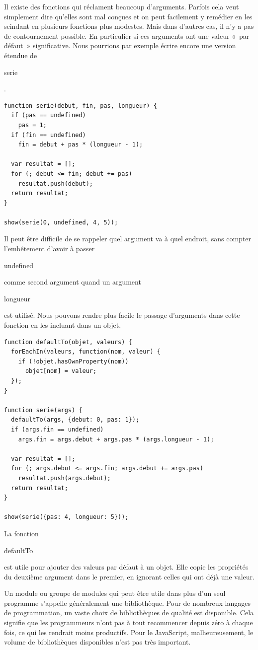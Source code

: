 \documentclass{FramateX}
\renewcommand{\texttt}[1]{\begin{sffamily}{#1}\end{sffamily}}
\begin{document}
\begin{center}\end{center}

Il existe des fonctions qui réclament beaucoup d'arguments. Parfois cela
veut simplement dire qu'elles sont mal conçues et on peut facilement y
remédier en les scindant en plusieurs fonctions plus modestes. Mais dans
d'autres cas, il n'y a pas de contournement possible. En particulier si
ces arguments ont une valeur «~par défaut~» significative. Nous
pourrions par exemple écrire encore une version étendue de
\texttt{serie}.

\begin{lstlisting}
function serie(debut, fin, pas, longueur) {
  if (pas == undefined)
    pas = 1;
  if (fin == undefined)
    fin = debut + pas * (longueur - 1);

  var resultat = [];
  for (; debut <= fin; debut += pas)
    resultat.push(debut);
  return resultat;
}

show(serie(0, undefined, 4, 5));
\end{lstlisting}
Il peut être difficile de se rappeler quel argument va à quel endroit,
sans compter l'embêtement d'avoir à passer \texttt{undefined} comme
second argument quand un argument \texttt{longueur} est utilisé. Nous
pouvons rendre plus facile le passage d'arguments dans cette fonction en
les incluant dans un objet.

\begin{lstlisting}
function defaultTo(objet, valeurs) {
  forEachIn(valeurs, function(nom, valeur) {
    if (!objet.hasOwnProperty(nom))
      objet[nom] = valeur;
  });
}

function serie(args) {
  defaultTo(args, {debut: 0, pas: 1});
  if (args.fin == undefined)
    args.fin = args.debut + args.pas * (args.longueur - 1);

  var resultat = [];
  for (; args.debut <= args.fin; args.debut += args.pas)
    resultat.push(args.debut);
  return resultat;
}

show(serie({pas: 4, longueur: 5}));
\end{lstlisting}
La fonction \texttt{defaultTo} est utile pour ajouter des valeurs par
défaut à un objet. Elle copie les propriétés du deuxième argument dans
le premier, en ignorant celles qui ont déjà une valeur.

\begin{center}\end{center}

Un module ou groupe de modules qui peut être utile dans plus d'un seul
programme s'appelle généralement une bibliothèque. Pour de nombreux
langages de programmation, un vaste choix de bibliothèques de qualité
est disponible. Cela signifie que les programmeurs n'ont pas à tout
recommencer depuis zéro à chaque fois, ce qui les rendrait moins
productifs. Pour le JavaScript, malheureusement, le volume de
bibliothèques disponibles n'est pas très important.
\end{document}
